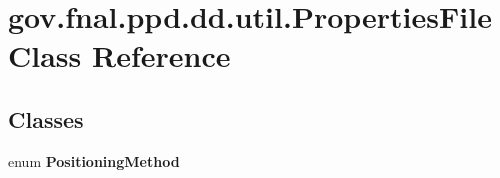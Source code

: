 \hypertarget{classgov_1_1fnal_1_1ppd_1_1dd_1_1util_1_1PropertiesFile}{\section{gov.\-fnal.\-ppd.\-dd.\-util.\-Properties\-File Class Reference}
\label{classgov_1_1fnal_1_1ppd_1_1dd_1_1util_1_1PropertiesFile}
}
\subsection*{Classes}
\begin{DoxyCompactItemize}
\item 
enum {\bfseries Positioning\-Method}
\end{DoxyCompactItemize}
